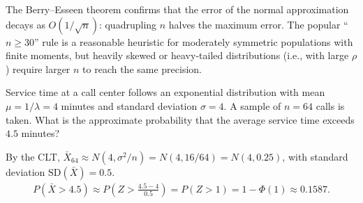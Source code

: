 \begin{observacion}
The Berry--Esseen theorem confirms that the error of the normal approximation decays as $O(1/\sqrt{n})$: quadrupling $n$ halves the maximum error. The popular ``$n \ge 30$'' rule is a reasonable heuristic for moderately symmetric populations with finite moments, but heavily skewed or heavy-tailed distributions (i.e., with large $\rho$) require larger $n$ to reach the same precision.
\end{observacion}

\begin{ejemplo}
 \label{exmp:5.2.1}
Service time at a call center follows an exponential distribution with mean $\mu = 1/\lambda = 4$ minutes and standard deviation $\sigma = 4$. A sample of $n=64$ calls is taken. What is the approximate probability that the average service time exceeds $4.5$ minutes?
\end{ejemplo}

\begin{solucion}
By the CLT, $\bar{X}_{64} \approx N(4, \sigma^2/n) = N(4, 16/64) = N(4, 0.25)$, with standard deviation $\text{SD}(\bar{X}) = 0.5$.
\begin{align}
 P(\bar{X} > 4.5) \approx P\!\left(Z > \frac{4.5-4}{0.5}\right) = P(Z>1) = 1-\Phi(1)
 \approx 0.1587.
\end{align}
\end{solucion}
